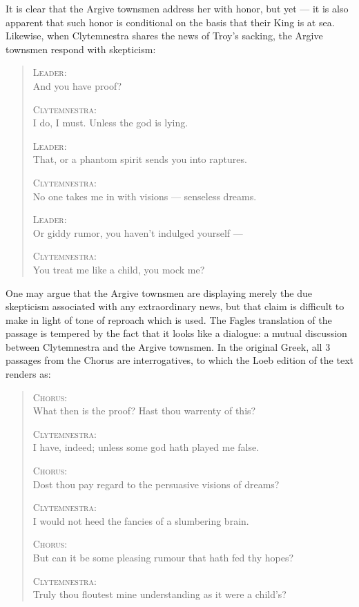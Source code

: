 \noindent
It is clear that the Argive townsmen address her with honor, but yet --- it is
also apparent that such honor is conditional on the basis that their King is
at sea. Likewise, when Clytemnestra shares the news of Troy's sacking, the
Argive townsmen respond with skepticism:

\begin{quote}
  \textsc{Leader}: \\
  And you have proof?

  \textsc{Clytemnestra}: \\
  I do, I must. Unless the god is lying.

  \textsc{Leader}: \\
  That, or a phantom spirit sends you into raptures.

  \textsc{Clytemnestra}: \\
  No one takes me in with visions --- senseless dreams.

  \textsc{Leader}: \\
  Or giddy rumor, you haven't indulged yourself ---

  \textsc{Clytemnestra}: \\
  You treat me like a child, you mock me?

  \autocite[275]{fagles}
\end{quote}

\noindent
One may argue that the Argive townsmen are displaying merely the due skepticism
associated with any extraordinary news, but that claim is difficult to make in
light of tone of reproach which is used. The Fagles translation of the passage
is tempered by the fact that it looks like a dialogue: a mutual discussion
between Clytemnestra and the Argive townsmen. In the original Greek, all 3
passages from the Chorus are interrogatives, to which the Loeb edition of the
text renders as:

\begin{quote}
  \textsc{Chorus}: \\
  What then is the proof? Hast thou warrenty of this?

  \textsc{Clytemnestra}: \\
  I have, indeed; unless some god hath played me false.

  \textsc{Chorus}: \\
  Dost thou pay regard to the persuasive visions of dreams?

  \textsc{Clytemnestra}: \\
  I would not heed the fancies of a slumbering brain.

  \textsc{Chorus}: \\
  But can it be some pleasing rumour that hath fed thy hopes?

  \textsc{Clytemnestra}: \\
  Truly thou floutest mine understanding as it were a child's?

  \autocite[275]{loeb}
\end{quote}

